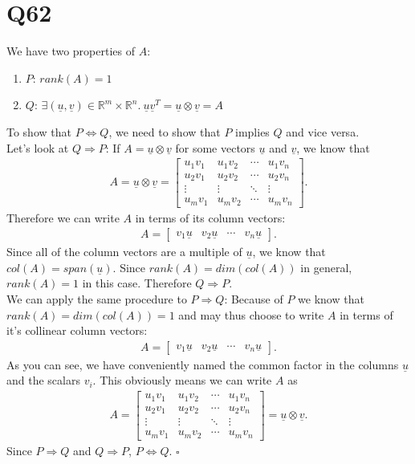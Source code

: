 \documentclass{article}
\renewcommand{\vec}{\underline}
\begin{document}
\section*{Q62}
We have two properties of $A$:
\begin{enumerate}
    \item $P$: $rank(A)=1$
    \item $Q$: $\exists (\vec u, \vec v) \in \mathbb{R}^m \times \mathbb{R}^n.\: \vec u\vec v^T = \vec u \otimes \vec v = A$
\end{enumerate}
To show that $P \Leftrightarrow Q$, we need to show that $P$ implies $Q$ and vice versa.\\
Let's look at $Q\Rightarrow P$: If $A=\vec u \otimes \vec v$ for some vectors $\vec u$ and $\vec v$, we know that
\begin{align*}
    A = \vec u \otimes \vec v = \begin{bmatrix}
        u_1v_1 &u_1v_2&\cdots &u_1v_n\\
        u_2v_1 &u_2v_2&\cdots &u_2v_n\\
        \vdots &\vdots &\ddots &\vdots\\
        u_mv_1 &u_mv_2&\cdots &u_mv_n
    \end{bmatrix}.
\end{align*}
Therefore we can write $A$ in terms of its column vectors:
\begin{align*}
    A = \begin{bmatrix}
        v_1\vec u &v_2 \vec u&\cdots &v_n\vec u
    \end{bmatrix}.
\end{align*}
Since all of the column vectors are a multiple of $\vec u$, we know that $col(A)=span(\vec u)$.
Since $rank(A)=dim(col(A))$ in general, $rank(A)=1$ in this case.
Therefore $Q\Rightarrow P$.\\
We can apply the same procedure to $P\Rightarrow Q$: Because of $P$ we know that $rank(A)=dim(col(A))=1$ and may thus choose to write $A$ in terms of it's collinear column vectors:
\begin{align*}
 A = \begin{bmatrix}
        v_1\vec u &v_2 \vec u&\cdots &v_n\vec u
    \end{bmatrix}.
\end{align*}
As you can see, we have conveniently named the common factor in the columns $\vec u$ and the scalars $v_i$.
This obviously means we can write $A$ as
\begin{align*}
    A = \begin{bmatrix}
        u_1v_1 &u_1v_2&\cdots &u_1v_n\\
        u_2v_1 &u_2v_2&\cdots &u_2v_n\\
        \vdots &\vdots &\ddots &\vdots\\
        u_mv_1 &u_mv_2&\cdots &u_mv_n
    \end{bmatrix} = \vec u \otimes \vec v.
\end{align*}
Since $P\Rightarrow Q$ and $Q\Rightarrow P$, $P\Leftrightarrow Q$. $\square$
\end{document}
